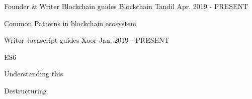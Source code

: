 


\begin{cventries}


\cventry
{Founder \& Writer} %
{Blockchain guides} %
{Blockchain Tandil} %
{Apr. 2019 - PRESENT} %
{ %
\begin{cvitems}
\item {Common Patterns in blockchain ecosystem}
\end{cvitems}
}


\cventry
{Writer} %
{Javascript guides} %
{Xoor} %
{Jan. 2019 - PRESENT} %
{ %
\begin{cvitems}
\item {ES6}
\item {Understanding this}
\item {Destructuring}
\end{cvitems}
}

\end{cventries}
